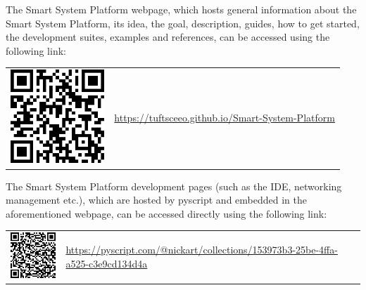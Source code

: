 The Smart System Platform webpage, which hosts general information about the Smart System Platform, its idea, the goal, description, guides, how to get started, the development suites, examples and references, can be accessed using the following link:
\vspace{25pt}
\begin{center}
\begin{tabular}{>{\centering\arraybackslash} m{175pt} m{272pt}}
 \includegraphics[width=100pt]{images/website-QRcode.png} & 
 \url{https://tuftsceeo.github.io/Smart-System-Platform}\\
\end{tabular}
\end{center}
\vspace{25pt}

The Smart System Platform development pages (such as the IDE, networking management etc.), which are hosted by pyscript and embedded in the aforementioned webpage, can be accessed directly using the following link:
\vspace{25pt}
\begin{center}
\begin{tabular}{>{\centering\arraybackslash} m{175pt} m{272pt}}
 \includegraphics[width=100pt]{images/pyscript-QRcode.png} & 
 \url{https://pyscript.com/@nickart/collections/153973b3-25be-4ffa-a525-c3e9cd134d4a}\\
\end{tabular}
\end{center}




